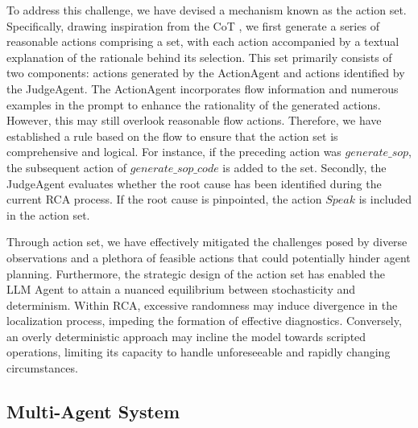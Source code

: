 To address this challenge, we have devised a mechanism known as the action set. Specifically, drawing inspiration from the CoT \citep{wei2022chain}, we first generate a series of reasonable actions comprising a set, with each action accompanied by a textual explanation of the rationale behind its selection. This set primarily consists of two components: actions generated by the ActionAgent and actions identified by the JudgeAgent. The ActionAgent incorporates flow information and numerous examples in the prompt to enhance the rationality of the generated actions. However, this may still overlook reasonable flow actions. Therefore, we have established a rule based on the flow to ensure that the action set is comprehensive and logical. For instance, if the preceding action was $generate\_sop$, the subsequent action of $generate\_sop\_code$ is added to the set. Secondly, the JudgeAgent evaluates whether the root cause has been identified during the current RCA process. If the root cause is pinpointed, the action $Speak$ is included in the action set.

Through action set, we have effectively mitigated the challenges posed by diverse observations and a plethora of feasible actions that could potentially hinder agent planning. Furthermore, the strategic design of the action set has enabled the LLM Agent to attain a nuanced equilibrium between stochasticity and determinism. Within RCA, excessive randomness may induce divergence in the localization process, impeding the formation of effective diagnostics. Conversely, an overly deterministic approach may incline the model towards scripted operations, limiting its capacity to handle unforeseeable and rapidly changing circumstances.

\subsection{Multi-Agent System}

